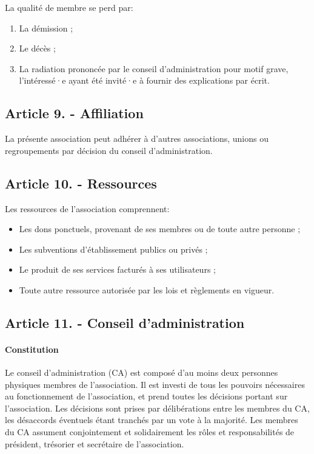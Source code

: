 \documentclass[a4paper]{article}
\begin{document}
La qualité de membre se perd par:
\begin{enumerate}
    \item La démission ;
    \item Le décès ;
    \item La radiation prononcée par le conseil d'administration pour motif grave, l'intéressé·e ayant été
        invité·e à fournir des explications par écrit.
\end{enumerate}

\subsection*{Article 9. - Affiliation}

La présente association peut adhérer à d'autres associations, unions ou regroupements par décision du
conseil d'administration.

\subsection*{Article 10. - Ressources}

Les ressources de l'association comprennent:
\begin{itemize}
    \item Les dons ponctuels, provenant de ses membres ou de toute autre personne ;
    \item Les subventions d'établissement publics ou privés ;
    \item Le produit de ses services facturés à ses utilisateurs ;
    \item Toute autre ressource autorisée par 
        les lois et règlements en vigueur.
\end{itemize}

\subsection*{Article 11. - Conseil d'administration}

\paragraph{Constitution}
Le conseil d'administration (CA) est composé d'au moins deux
personnes physiques membres de l'association.
Il est investi de tous les pouvoirs nécessaires au fonctionnement de l'association, et prend toutes les décisions portant sur l'association.
Les décisions sont prises par délibérations entre les membres du CA, les désaccords éventuels étant tranchés par un vote à la majorité.
Les membres du CA assument conjointement et solidairement les rôles et responsabilités de président, trésorier et secrétaire de l'association.
\end{document}
